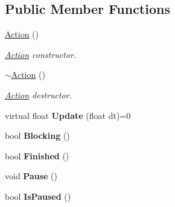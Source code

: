 \subsection*{Public Member Functions}
\begin{DoxyCompactItemize}
\item 
\hypertarget{classDCEngine_1_1Action_a6ad5f4f266c7f34942b5d4b96a1cd138}{\hyperlink{classDCEngine_1_1Action_a6ad5f4f266c7f34942b5d4b96a1cd138}{Action} ()}\label{classDCEngine_1_1Action_a6ad5f4f266c7f34942b5d4b96a1cd138}

\begin{DoxyCompactList}\small\item\em \hyperlink{classDCEngine_1_1Action}{Action} constructor. \end{DoxyCompactList}\item 
\hypertarget{classDCEngine_1_1Action_a2dda0fc5425ccf01d83f57a90ada9136}{\hyperlink{classDCEngine_1_1Action_a2dda0fc5425ccf01d83f57a90ada9136}{$\sim$\-Action} ()}\label{classDCEngine_1_1Action_a2dda0fc5425ccf01d83f57a90ada9136}

\begin{DoxyCompactList}\small\item\em \hyperlink{classDCEngine_1_1Action}{Action} destructor. \end{DoxyCompactList}\item 
\hypertarget{classDCEngine_1_1Action_a0dd052cd4b914c78119a77fb914267e3}{virtual float {\bfseries Update} (float dt)=0}\label{classDCEngine_1_1Action_a0dd052cd4b914c78119a77fb914267e3}

\item 
\hypertarget{classDCEngine_1_1Action_a6c0213267106d544b2b39ac5d8cd9cec}{bool {\bfseries Blocking} ()}\label{classDCEngine_1_1Action_a6c0213267106d544b2b39ac5d8cd9cec}

\item 
\hypertarget{classDCEngine_1_1Action_a436718f4a14d668d81e877353dbb9e48}{bool {\bfseries Finished} ()}\label{classDCEngine_1_1Action_a436718f4a14d668d81e877353dbb9e48}

\item 
\hypertarget{classDCEngine_1_1Action_a15c1bd70492305c1f940bfe1e2d1edb3}{void {\bfseries Pause} ()}\label{classDCEngine_1_1Action_a15c1bd70492305c1f940bfe1e2d1edb3}

\item 
\hypertarget{classDCEngine_1_1Action_a908b043fa651e1b6554c3743be54a99e}{bool {\bfseries Is\-Paused} ()}\label{classDCEngine_1_1Action_a908b043fa651e1b6554c3743be54a99e}

\end{DoxyCompactItemize}
